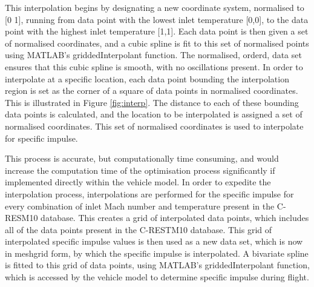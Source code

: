 This interpolation begins by designating a new coordinate system, normalised to [0 1], running from data point with the lowest inlet temperature [0,0], to the data point with the highest inlet temperature [1,1]. Each data point is then given a set of normalised coordinates, and a cubic spline is fit to this set of normalised points using MATLAB's \textsf{griddedInterpolant} function. The normalised, orderd, data set ensures that this cubic spline is smooth, with no oscillations present. In order to interpolate at a specific location, each data point bounding the interpolation region is set as the corner of a square of data points in normalised coordinates. This is illustrated in Figure \ref{fig:interp}. The distance to each of these bounding data points is calculated, and the location to be interpolated is assigned a set of normalised coordinates. This set of normalised coordinates is used to interpolate for specific impulse. 

This process is accurate, but computationally time consuming, and would increase the computation time of the optimisation process significantly if implemented directly within the vehicle model.
 In order to expedite the interpolation process, interpolations are performed for the specific impulse for every combination of inlet Mach number and temperature present in the C-RESM10 database. This creates a grid of interpolated data points, which includes all of the data points present in the C-RESTM10 database. This grid of interpolated specific impulse values is then used as a new data set, which is now in \textsf{meshgrid} form, by which the specific impulse is interpolated. A bivariate spline is fitted to this grid of data points, using MATLAB's \textsf{griddedInterpolant} function, which is accessed by the vehicle model to determine specific impulse during flight.  
